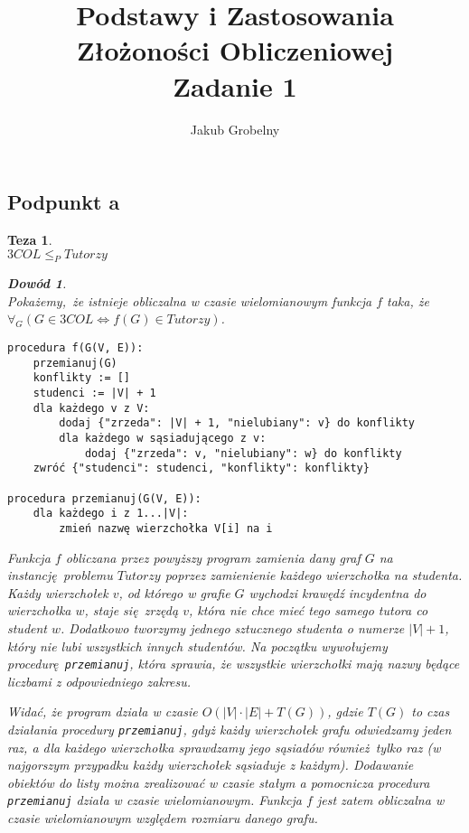 \documentclass[12pt]{article}
\title{\bfseries Podstawy i Zastosowania Złożoności Obliczeniowej\\\Large Zadanie 1}
\date{}
\author{\Large Jakub Grobelny}
\newtheorem*{theorem*}{Teza}
\newtheorem*{proof*}{Dowód}
\begin{document}
\begin{titlepage}
\maketitle
\thispagestyle{empty}

\hrulefill
\section{Podpunkt a}
\begin{theorem*}\,\\
$3COL \leq_P Tutorzy$
    \begin{proof*} \,\\\normalfont    
    Pokażemy, że istnieje obliczalna w czasie wielomianowym funkcja $f$ taka, 
    że $\forall_G(G \in 3COL \Leftrightarrow f(G) \in Tutorzy)$.
    
\begin{verbatim}
procedura f(G(V, E)):
    przemianuj(G)
    konflikty := []
    studenci := |V| + 1
    dla każdego v z V:
        dodaj {"zrzeda": |V| + 1, "nielubiany": v} do konflikty
        dla każdego w sąsiadującego z v:
            dodaj {"zrzeda": v, "nielubiany": w} do konflikty
    zwróć {"studenci": studenci, "konflikty": konflikty}

procedura przemianuj(G(V, E)):
    dla każdego i z 1...|V|:
        zmień nazwę wierzchołka V[i] na i

\end{verbatim}

Funkcja $f$ obliczana przez powyższy program zamienia dany graf $G$ na 
instancję problemu $Tutorzy$ poprzez zamienienie każdego wierzchołka na 
studenta. Każdy wierzchołek $v$, od którego w grafie $G$ wychodzi krawędź 
incydentna do wierzchołka $w$, staje się \textit{zrzędą} $v$, która nie chce 
mieć tego samego tutora co student $w$. Dodatkowo tworzymy jednego sztucznego 
studenta o numerze $|V|+1$, który nie lubi wszystkich innych studentów. Na początku wywołujemy procedurę \texttt{przemianuj}, która sprawia, że wszystkie wierzchołki mają nazwy będące liczbami z odpowiedniego zakresu.

Widać, że program działa w czasie $O(|V|\cdot|E|+T(G))$, gdzie 
$T(G)$ to czas działania procedury \texttt{przemianuj}, gdyż każdy 
wierzchołek grafu odwiedzamy jeden raz, a dla każdego wierzchołka sprawdzamy 
jego sąsiadów również tylko raz (w najgorszym przypadku każdy wierzchołek 
sąsiaduje z każdym). Dodawanie obiektów do listy można zrealizować w czasie 
stałym a pomocnicza procedura \texttt{przemianuj} działa w czasie 
wielomianowym. Funkcja $f$ jest zatem obliczalna w czasie wielomianowym
względem rozmiaru danego grafu.


\end{proof*}
\end{theorem*}
\end{titlepage}
\end{document}

